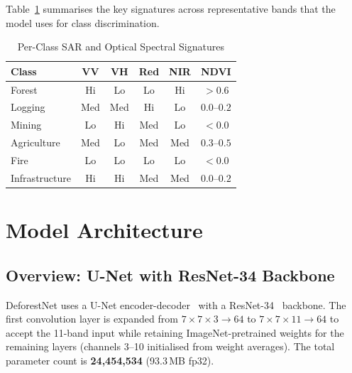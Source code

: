 \documentclass[10pt,conference]{IEEEtran}
\begin{document}
Table~\ref{tab:spectral} summarises the key signatures across representative
bands that the model uses for class discrimination.

\begin{table}[!t]
  \caption{Per-Class SAR and Optical Spectral Signatures}
  \label{tab:spectral}
  \centering
  \small
  \renewcommand{\arraystretch}{1.15}
  \begin{tabular}{l c c c c c}
    \toprule
    \textbf{Class} & \textbf{VV} & \textbf{VH} & \textbf{Red} &
                     \textbf{NIR} & \textbf{NDVI} \\
    \midrule
    \rowcolor{rowforest}  Forest         & Hi  & Lo  & Lo  & Hi  & $>0.6$ \\
    \rowcolor{rowlog}     Logging        & Med & Med & Hi  & Lo  & $0.0$--$0.2$ \\
    \rowcolor{rowmine}    Mining         & Lo  & Hi  & Med & Lo  & $<0.0$ \\
    \rowcolor{rowagri}    Agriculture    & Med & Lo  & Med & Med & $0.3$--$0.5$ \\
    \rowcolor{rowfire}    Fire           & Lo  & Lo  & Lo  & Lo  & $<0.0$ \\
    \rowcolor{rowinfra}   Infrastructure & Hi  & Hi  & Med & Med & $0.0$--$0.2$ \\
    \bottomrule
  \end{tabular}
\end{table}

\section{Model Architecture}
\label{sec:model}

\subsection{Overview: U-Net with ResNet-34 Backbone}

DeforestNet uses a U-Net encoder-decoder~\cite{ronneberger2015unet} with a
ResNet-34~\cite{he2016deep} backbone. The first convolution layer is expanded
from $7{\times}7{\times}3{\to}64$ to $7{\times}7{\times}11{\to}64$ to accept
the 11-band input while retaining ImageNet-pretrained weights for the remaining
layers (channels 3--10 initialised from weight averages). The total parameter
count is \textbf{24,454,534} (93.3\,MB fp32).
\end{document}
